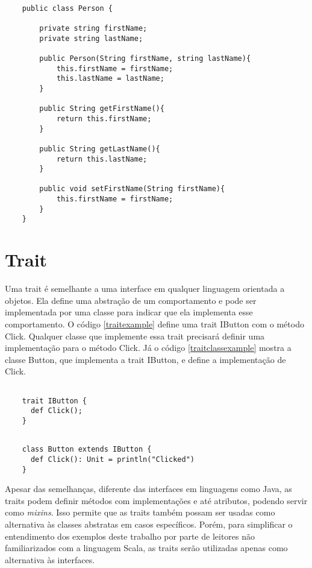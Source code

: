 \begin{lstlisting}[caption={Construtor Simples em Java},label=javaimmutableattr]

    public class Person {
        
        private string firstName;
        private string lastName;
        
        public Person(String firstName, string lastName){
            this.firstName = firstName;
            this.lastName = lastName;
        }
        
        public String getFirstName(){
            return this.firstName;
        }
        
        public String getLastName(){
            return this.lastName;
        }
        
        public void setFirstName(String firstName){
            this.firstName = firstName;
        }
    }

\end{lstlisting}


\section{Trait}

Uma trait é semelhante a uma interface em qualquer 
linguagem orientada a objetos. Ela define uma abstração 
de um comportamento e pode ser implementada por uma 
classe para indicar que ela implementa esse comportamento.\cite{ordesky2008} 
O código \ref{traitexample} define uma trait IButton com 
o método Click. Qualquer classe que implemente essa trait 
precisará definir uma implementação para o método Click. 
Já o código \ref{traitclassexample} mostra a classe 
Button, que implementa a trait IButton, e define a 
implementação de Click.

\begin{lstlisting}[caption={Exemplo de Trait},label=traitexample]

    trait IButton {
      def Click();
    }

\end{lstlisting}

\begin{lstlisting}[caption={Exemplo de classe que implementa uma trait},label=traitclassexample]

    class Button extends IButton {
      def Click(): Unit = println("Clicked")
    }

\end{lstlisting}

Apesar das semelhanças, diferente das interfaces em 
linguagens como Java, as traits podem definir métodos 
com implementações e até atributos, podendo servir 
como \textit{mixins}\cite{wampler2021}. Isso permite que 
as traits também possam ser usadas como alternativa 
às classes abstratas em casos específicos. Porém, para 
simplificar o entendimento dos exemplos deste 
trabalho por parte de leitores não familiarizados 
com a linguagem Scala, as traits serão utilizadas 
apenas como alternativa às interfaces.


